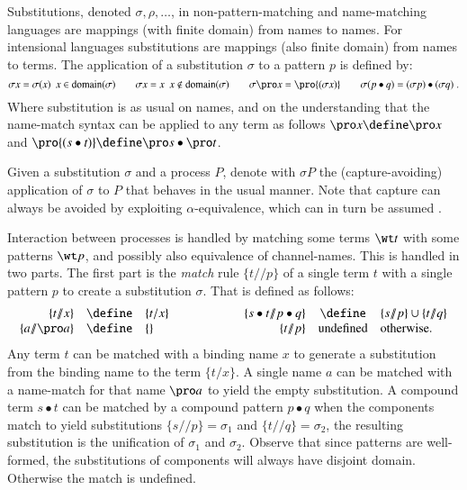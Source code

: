 \documentclass[submission,copyright,creativecommons]{eptcs}
\begin{document}
Substitutions, denoted $\sigma,\rho,\ldots$, in non-pattern-matching and name-matching
languages are mappings (with finite domain) from names to names. For intensional languages
substitutions are mappings (also finite domain) from names to terms.
The application of a substitution $\sigma$ to a pattern $p$ is defined by: \begin{equation*}
\sigma x = \sigma(x)\ \ x\in\mbox{domain}(\sigma)\qquad
\sigma x = x\ \ x\not\in\mbox{domain}(\sigma)\qquad
\sigma \pro x = \pro {(\sigma x)}\qquad
\sigma (p\bullet q) = (\sigma p)\bullet(\sigma q)\; .
\end{equation*}
Where substitution is as usual on names, and on the understanding that the name-match
syntax can be applied to any term as follows
$\pro x \define \pro x$ and $\pro {(s\bullet t)} \define \pro s\bullet \pro t$.


Given a substitution $\sigma$ and a process $P$, denote with $\sigma P$ the
(capture-avoiding) application of $\sigma$ to $P$ that behaves in the usual manner.
Note that capture can always be avoided by exploiting $\alpha$-equivalence, which can
in turn be assumed \cite{UBN07}. 

\renewcommand{\match}[2]{\{#1/\!\!/#2\}}

Interaction between processes is handled by matching some terms $\wt t$ with
some patterns $\wt p$, and possibly also equivalence of channel-names.
This is handled in two parts. The first part is the {\em match} rule $\match t p$ of a single term $t$
with a single pattern $p$ to create a substitution $\sigma$.
That is defined as follows:
\begin{eqnarray*}
\begin{array}{rcl}
\match t x &\define& \{t/x\}\\
\match a {\pro a} &\define& \{\}
\end{array}&\qquad\qquad&
\begin{array}{rcl}
\match {s\bullet t} {p\bullet q} &\define& \match s p \cup \match t q\\
\match t p &\mbox{undefined}& \mbox{otherwise.}
\end{array}
\end{eqnarray*}
Any term $t$ can be matched with a binding name $x$ to generate a substitution from the
binding name to the term $\{t/x\}$.
A single name $a$ can be matched with a name-match for that name $\pro a$ to yield the
empty substitution.
A compound term $s\bullet t$ can be matched by a compound pattern $p\bullet q$ when
the components match to yield substitutions $\match s p=\sigma_1$ and $\match t q=\sigma_2$,
the resulting substitution is the unification of $\sigma_1$ and $\sigma_2$.
Observe that since patterns are well-formed, the substitutions of components will always have
disjoint domain.
Otherwise the match is undefined.
\end{document}
